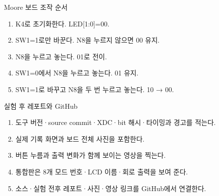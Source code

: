 \begin{frame}{Moore 보드 조작 순서}
\small
\begin{enumerate}
\item K4로 초기화한다. LED[1:0]=00.
\item SW1=1로만 바꾼다. N8을 누르지 않으면 00 유지.
\item N8을 누르고 놓는다. 01로 전이.
\item SW1=0에서 N8을 누르고 놓는다. 01 유지.
\item SW1=1로 바꾸고 N8을 두 번 누르고 놓는다. 10 → 00.
\end{enumerate}
\end{frame}

\begin{frame}{실험 후 레포트와 GitHub}
\small
\begin{enumerate}
\item 도구 버전·source commit·XDC·bit 해시·타이밍과 경고를 적는다.
\item 실제 기록 화면과 보드 전체 사진을 포함한다.
\item 버튼 누름과 출력 변화가 함께 보이는 영상을 찍는다.
\item 통합판은 8개 모드 번호·LCD 이름·회로 출력을 보여 준다.
\item 소스·실험 전후 레포트·사진·영상 링크를 GitHub에서 연결한다.
\end{enumerate}
\end{frame}

